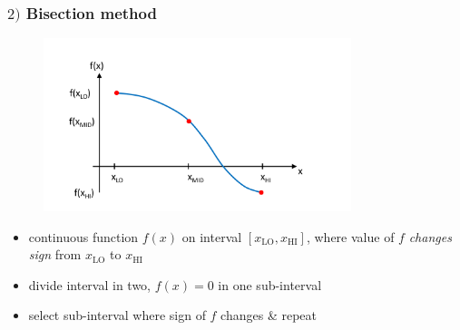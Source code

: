 \documentclass[english,14pt]{beamer}
\begin{document}

\begin{frame}[fragile]

\frametitle{$2)$ Bisection method}

\vspace*{-15mm}
\begin{figure}[ht]
	\centering
	\includegraphics[width=0.8\textwidth]{figures/bisection1}
\end{figure}
\vspace*{-10mm}
\begin{itemize}
\item continuous function $f(x)$ on interval $[x_\mathrm{LO},x_\mathrm{HI}]$, where value of $f$ \emph{changes sign} from $x_\mathrm{LO}$ to $x_\mathrm{HI}$
\item divide interval in two, $f(x)=0$ in one sub-interval
\item select sub-interval where sign of $f$ changes \& repeat
\end{itemize}

\end{frame}

\end{document}
